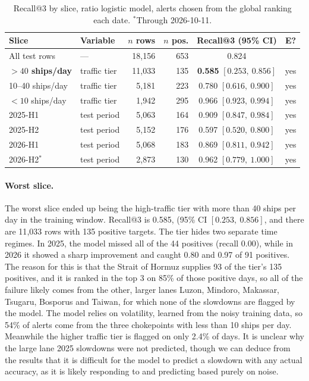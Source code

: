 \documentclass[11pt]{article}
\begin{document}
\begin{table}[ht]
\centering\small
\begin{tabular}{llrrcc}
\toprule
Slice & Variable & $n$ rows & $n$ pos. & Recall@3 (95\% CI) & E? \\
\midrule
All test rows & --- & 18{,}156 & 653 & 0.824 & \\
\midrule
\textbf{$>40$ ships/day} & traffic tier & 11{,}033 & 135 & \textbf{0.585} $[0.253,\ 0.856]$ & yes \\
10--40 ships/day & traffic tier & 5{,}181 & 223 & 0.780 $[0.616,\ 0.900]$ & yes \\
$<10$ ships/day & traffic tier & 1{,}942 & 295 & 0.966 $[0.923,\ 0.994]$ & yes \\
\midrule
2025-H1 & test period & 5{,}063 & 164 & 0.909 $[0.847,\ 0.984]$ & yes \\
2025-H2 & test period & 5{,}152 & 176 & 0.597 $[0.520,\ 0.800]$ & yes \\
2026-H1 & test period & 5{,}068 & 183 & 0.869 $[0.811,\ 0.942]$ & yes \\
2026-H2$^{*}$ & test period & 2{,}873 & 130 & 0.962 $[0.779,\ 1.000]$ & yes \\
\bottomrule
\end{tabular}
\caption{Recall@3 by slice, ratio logistic model, alerts chosen from the global ranking each date. $^{*}$Through 2026-10-11.}
\end{table}

\paragraph{Worst slice.}
The worst slice ended up being the high-traffic tier with more than 40 ships per day in the training window. Recall@3 is 0.585, (95\% CI $[0.253, \ 0.856]$, and there are 11{,}033 rows with 135 positive targets. The tier hides two separate time regimes. In 2025, the model missed all of the 44 positives (recall 0.00), while in 2026 it showed a sharp improvement and caught 0.80 and 0.97 of 91 positives. The reason for this is that the Strait of Hormuz supplies 93 of the tier's 135 positives, and it is ranked in the top 3 on 85\% of those positive days, so all of the failure likely comes from the other, larger lanes Luzon, Mindoro, Makassar, Tsugaru, Bosporus and Taiwan, for which none of the slowdowns are flagged by the model. The model relies on volatility, learned from the noisy training data, so 54\% of alerts come from the three chokepoints with less than 10 ships per day. Meanwhile the higher traffic tier is flagged on only 2.4\% of days. It is unclear why the large lane 2025 slowdowns were not predicted, though we can deduce from the results that it is difficult for the model to predict a slowdown with any actual accuracy, as it is likely responding to and predicting based purely on noise. 
\end{document}

